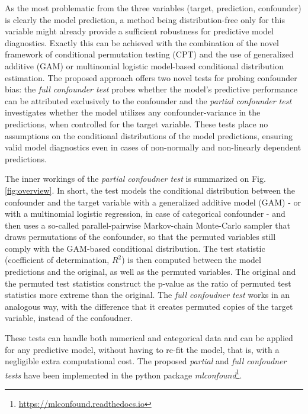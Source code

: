 \documentclass{article}
\begin{document}
As the most problematic from the three variables (target, prediction, confounder) is clearly the model prediction\citep{garcia2009study, kristensen2017whole}, a method being distribution-free only for this variable might already provide a sufficient robustness for predictive model diagnostics. Exactly this can be achieved with the combination of the novel framework of conditional permutation testing (CPT)\cite{berrett2020conditional} and the use of generalized additive (GAM)\citep{hastie1987generalized} or multinomial logistic model\cite{bennett1966multiple, jones1975proability}-based conditional distribution estimation. The proposed approach offers two novel tests for probing confounder bias: the \emph{full confounder test} probes whether the model's predictive performance can be attributed exclusively to the confounder and the \emph{partial confounder test} investigates whether the model utilizes any confounder-variance in the predictions, when controlled for the target variable.
These tests place no assumptions on the conditional distributions of the model predictions, ensuring valid model diagnostics even in cases of non-normally and non-linearly dependent predictions.

The inner workings of the \emph{partial confoudner test} is summarized on Fig. \ref{fig:overview}. In short, the test models the conditional distribution between the confounder and the target variable with a generalized additive model (GAM) - or with a multinomial logistic regression, in case of categorical confounder - and then uses a so-called parallel-pairwise Markov-chain Monte-Carlo sampler that draws permutations of the confounder, so that the permuted variables still comply with the GAM-based conditional distribution. The test statistic (coefficient of determination, $R^2$) is then computed between the model predictions and the original, as well as the permuted variables. The original and the permuted test statistics construct the p-value as the ratio of permuted test statistics more extreme than the original. The \emph{full confoudner test} works in an analogous way, with the difference that it creates permuted copies of the target variable, instead of the confoudner.

These tests can handle both numerical and categorical data and can be applied for any predictive model, without having to re-fit the model, that is, with a negligible extra computational cost.
The proposed \emph{partial} and \emph{full confoudner tests} have been implemented in the python package \emph{mlconfound}\footnote{\href{https://mlconfound.readthedocs.io}{https://mlconfound.readthedocs.io}}. 
\end{document}
